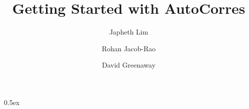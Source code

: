 \documentclass[11pt,a4paper]{article}
\begin{document}
\title{Getting Started with AutoCorres}
\author{Japheth Lim \and Rohan Jacob-Rao \and David Greenaway}
\maketitle

\tableofcontents
\clearpage

\parindent 0pt\parskip 0.5ex





\end{document}
